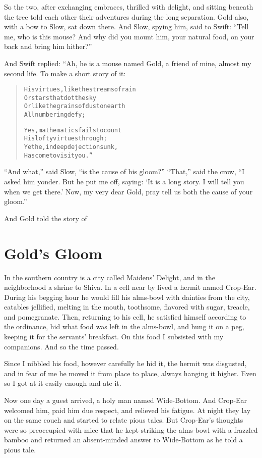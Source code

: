 \documentclass[article, twoside, 14pt]{memoir}
\renewenvironment{verbatim}{%
\begin{quote}%
\vskip -10pt%
\begin{alltt}\normalfont\large}{\end{alltt}%
\end{quote}%
\vskip -10pt
} %
\begin{document}
So the two, after exchanging embraces, thrilled with delight, and
sitting beneath the tree told each other their adventures during
the long separation. Gold also, with a bow to Slow, sat down there.
And Slow, spying him, said to Swift:
``Tell me, who is this mouse? And why did you mount him, your natural food, on your back and bring him hither?''

And Swift replied: “Ah, he is a mouse named Gold, a friend of mine,
almost my second life. To make a short story of it:

\begin{verbatim}
His virtues, like the streams of rain
    Or stars that dot the sky
Or like the grains of dust on earth
    All numbering defy;

Yes, mathematics fails to count
    His lofty virtues through;
Yet he, in deep dejection sunk,
    Has come to visit you.”
\end{verbatim}
``And what,'' said Slow, ``is the cause of his gloom?'' ``That,''
said the crow,
``I asked him yonder. But he put me off, saying: `It is a long story. I will tell you when we get there.' Now, my very dear Gold, pray tell us both the cause of your gloom.''

And Gold told the story of

\chapter{Gold's Gloom}

\label{s38}

In the southern country is a city called Maidens' Delight, and in
the neighborhood a shrine to Shiva. In a cell near by lived a
hermit named Crop-Ear. During his begging hour he would fill his
alms-bowl with dainties from the city, eatables jellified, melting
 in the mouth, toothsome, flavored with sugar, treacle, and
pomegranate. Then, returning to his cell, he satisfied himself
according to the ordinance, hid what food was left in the
alms-bowl, and hung it on a peg, keeping it for the servants'
breakfast. On this food I subsisted with my companions. And so the
time passed.

Since I nibbled his food, however carefully he hid it, the hermit
was disgusted, and in fear of me he moved it from place to place,
always hanging it higher. Even so I got at it easily enough and ate
it.

Now one day a guest arrived, a holy man named Wide-Bottom. And
Crop-Ear welcomed him, paid him due respect, and relieved his
fatigue. At night they lay on the same couch and started to relate
pious tales. But Crop-Ear's thoughts were so preoccupied with mice
that he kept striking the alms-bowl with a frazzled bamboo and
returned an absent-minded answer to Wide-Bottom as he told a pious
tale.
\end{document}
